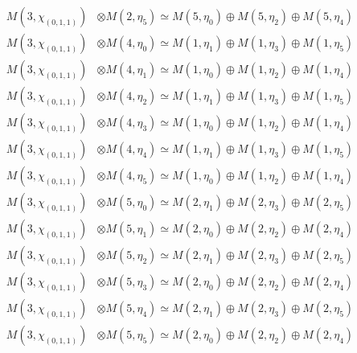 \begin{align*}
M(3,\chi_{(0,1,1)}) &\otimes M(2,\eta_{5}) \simeq M(5,\eta_{0}) \oplus M(5,\eta_{2}) \oplus M(5,\eta_{4}) \\
M(3,\chi_{(0,1,1)}) &\otimes M(4,\eta_{0}) \simeq M(1,\eta_{1}) \oplus M(1,\eta_{3}) \oplus M(1,\eta_{5}) \\
M(3,\chi_{(0,1,1)}) &\otimes M(4,\eta_{1}) \simeq M(1,\eta_{0}) \oplus M(1,\eta_{2}) \oplus M(1,\eta_{4}) \\
M(3,\chi_{(0,1,1)}) &\otimes M(4,\eta_{2}) \simeq M(1,\eta_{1}) \oplus M(1,\eta_{3}) \oplus M(1,\eta_{5}) \\
M(3,\chi_{(0,1,1)}) &\otimes M(4,\eta_{3}) \simeq M(1,\eta_{0}) \oplus M(1,\eta_{2}) \oplus M(1,\eta_{4}) \\
M(3,\chi_{(0,1,1)}) &\otimes M(4,\eta_{4}) \simeq M(1,\eta_{1}) \oplus M(1,\eta_{3}) \oplus M(1,\eta_{5}) \\
M(3,\chi_{(0,1,1)}) &\otimes M(4,\eta_{5}) \simeq M(1,\eta_{0}) \oplus M(1,\eta_{2}) \oplus M(1,\eta_{4}) \\
M(3,\chi_{(0,1,1)}) &\otimes M(5,\eta_{0}) \simeq M(2,\eta_{1}) \oplus M(2,\eta_{3}) \oplus M(2,\eta_{5}) \\
M(3,\chi_{(0,1,1)}) &\otimes M(5,\eta_{1}) \simeq M(2,\eta_{0}) \oplus M(2,\eta_{2}) \oplus M(2,\eta_{4}) \\
M(3,\chi_{(0,1,1)}) &\otimes M(5,\eta_{2}) \simeq M(2,\eta_{1}) \oplus M(2,\eta_{3}) \oplus M(2,\eta_{5}) \\
M(3,\chi_{(0,1,1)}) &\otimes M(5,\eta_{3}) \simeq M(2,\eta_{0}) \oplus M(2,\eta_{2}) \oplus M(2,\eta_{4}) \\
M(3,\chi_{(0,1,1)}) &\otimes M(5,\eta_{4}) \simeq M(2,\eta_{1}) \oplus M(2,\eta_{3}) \oplus M(2,\eta_{5}) \\
M(3,\chi_{(0,1,1)}) &\otimes M(5,\eta_{5}) \simeq M(2,\eta_{0}) \oplus M(2,\eta_{2}) \oplus M(2,\eta_{4}) \\
\end{align*}

